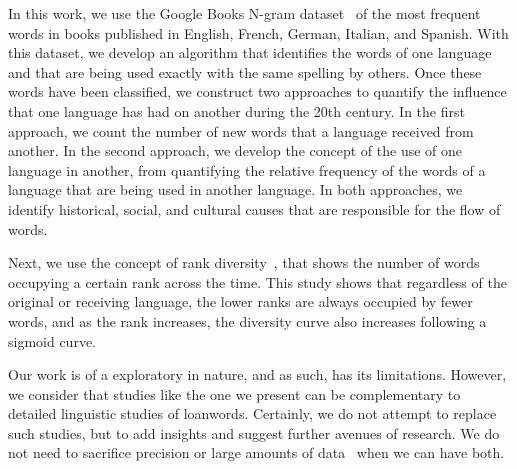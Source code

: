 \documentclass[10pt,letterpaper]{article} %
\begin{document}
	

In this work, we use the Google Books N-gram dataset~\cite{ngramv} of the most
frequent words in books published in English, French, German, Italian, and
Spanish. With this dataset,  we develop an algorithm that identifies
the words of one language and that are being used exactly with the same 
spelling by others. Once these words
have been classified, we construct two approaches to quantify the influence that
one language has had on another during the 20th century. In the first approach, we
count the number of new words that a language received from another. In
the second approach, we develop the concept of the use of one language in
another, from quantifying the relative frequency of  the words of a language
that are being used in another language. In both approaches, we identify historical, social,
and cultural causes that are responsible for the flow of words.

Next, we use the concept of rank diversity~\cite{iplosone},  that shows the number of words
occupying a certain rank across the time. This study shows that  regardless of
the original or receiving language,  the lower ranks are always occupied by
fewer words, and as the rank increases, the diversity curve also increases following a sigmoid curve. 


Our work is of a exploratory in nature, and as such, has its limitations. However, we consider that  studies like the one we present can be complementary to detailed linguistic studies of loanwords. Certainly, we do not attempt to replace such studies, but to add insights and suggest further avenues of research. We do not need to sacrifice precision or large amounts of data~\cite{Harford2014} when we can have both.

\end{document}
